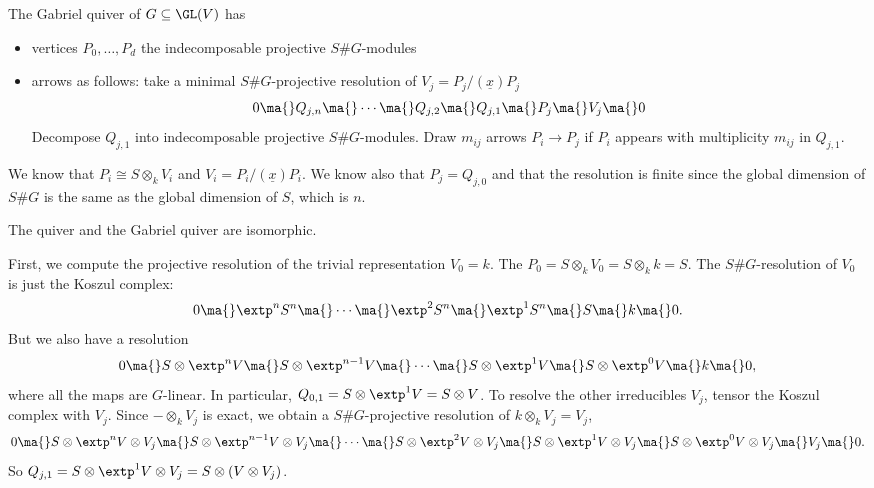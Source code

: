 \begin{dfn}
The Gabriel quiver of $G \subseteq \GL(V)$ has 
	\begin{itemize}
	\item vertices $P_0,\ldots,P_d$ the indecomposable projective $S\#G$-modules
	\item arrows as follows: take a minimal $S\#G$-projective resolution of $V_j= P_j/(\underline{x})P_j$
		\[
		0 \ma{} Q_{j,n} \ma{} \cdots \ma{} Q_{j,2} \ma{} Q_{j,1} \ma{} P_j \ma{} V_j \ma{} 0
		\]
	Decompose $Q_{j,1}$ into indecomposable projective $S\#G$-modules. Draw $m_{ij}$ arrows $P_i \to P_j$ if $P_i$ appears with multiplicity $m_{ij}$ in $Q_{j,1}$. 
	\end{itemize}
\end{dfn}


We know that $P_i \cong S \otimes_k V_i$ and $V_i = P_i/(\underline{x}) P_i$. We know also that $P_j= Q_{j,0}$ and that the resolution is finite since the global dimension of $S\#G$ is the same as the global dimension of $S$, which is $n$. 


\begin{thm}[Auslander]
The \mc quiver and the Gabriel quiver are isomorphic. 
\end{thm}

\pf First, we compute the projective resolution of the trivial representation $V_0= k$. The $P_0= S \otimes_k V_0= S \otimes_k k= S$. The $S\#G$-resolution of $V_0$ is just the Koszul complex:
	\[
	0 \ma{} \extp^n S^n \ma{} \cdots \ma{} \extp^2S^n \ma{} \extp^1 S^n \ma{} S \ma{} k \ma{} 0.
	\]
But we also have a resolution
	\[
	0 \ma{} S \otimes \extp^n V \ma{} S \otimes \extp^{n-1} V \ma{} \cdots \ma{} S \otimes \extp^1V \ma{} S \otimes \extp^0 V \ma{} k \ma{} 0,
	\]
where all the maps are $G$-linear. In particular, $Q_{0,1}= S \otimes \extp^1V= S \otimes V$. To resolve the other irreducibles $V_j$, tensor the Koszul complex with $V_j$. Since $- \otimes_k V_j$ is exact, we obtain a $S\#G$-projective resolution of $k \otimes_k V_j= V_j$,
	\[
	0 \ma{} S \otimes \extp^nV \otimes V_j \ma{} S \otimes \extp^{n-1}V \otimes V_j \ma{} \cdots \ma{} S \otimes \extp^2V \otimes V_j \ma{} S \otimes \extp^1V \otimes V_j \ma{} S \otimes \extp^0V \otimes V_j \ma{} V_j \ma{} 0.
	\]
So $Q_{j,1}= S \otimes \extp^1V \otimes V_j = S \otimes (V \otimes V_j)$.


